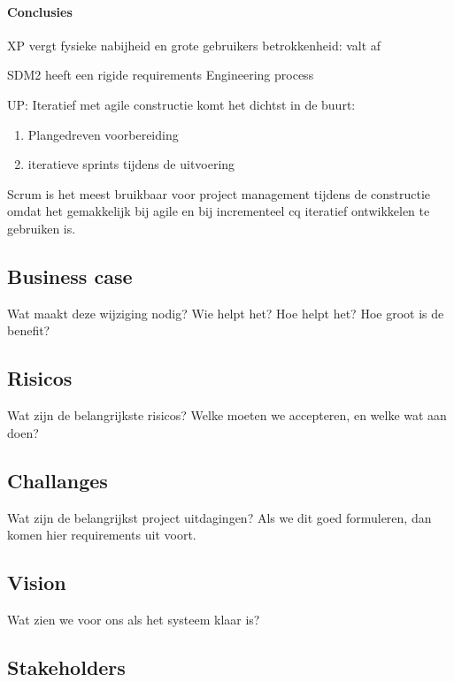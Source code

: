 \documentclass[a4paper,11pt,twoside,draft]{article}
\begin{document}
\paragraph{Conclusies}
\begin{description}
\item XP vergt fysieke nabijheid en grote gebruikers betrokkenheid: valt af
\item SDM2 heeft een rigide requirements Engineering process
\item UP: Iteratief met agile constructie komt het dichtst in de buurt:
\begin{enumerate}
 \item Plangedreven voorbereiding
 \item iteratieve sprints tijdens de uitvoering
\end{enumerate}
\end{description}

Scrum is het meest bruikbaar voor project management tijdens de constructie omdat
het gemakkelijk bij agile en bij incrementeel cq iteratief ontwikkelen te gebruiken is.

\subsection{Business case}

Wat maakt deze wijziging nodig? Wie helpt het? Hoe helpt het?
Hoe groot is de benefit?

\subsection{Risicos}

Wat zijn de belangrijkste risicos? Welke moeten we accepteren, en welke wat aan doen?


\subsection{Challanges}

Wat zijn de belangrijkst project uitdagingen? Als we dit goed formuleren, dan komen hier
requirements uit voort.

\subsection{Vision}

Wat zien we voor ons als het systeem klaar is?

\subsection{Stakeholders}
\end{document}
